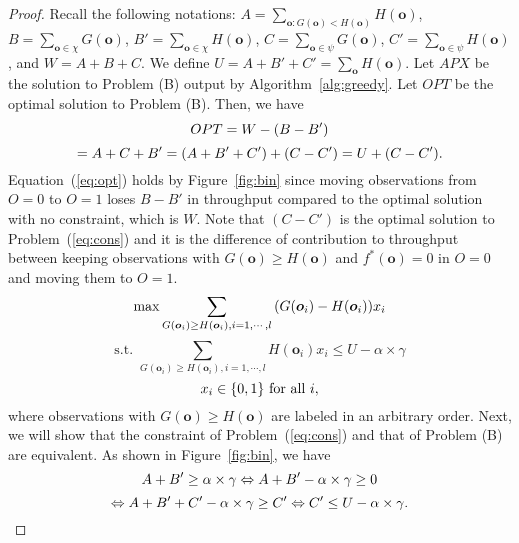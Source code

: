 \documentclass[conference]{IEEEtran}
\begin{document}
\begin{proof}
Recall the following notations: $A=\sum\limits_{\boldsymbol{o}:G(\boldsymbol{o})<H(\boldsymbol{o})}{H(\boldsymbol{o})}$, $B=\sum\limits_{\boldsymbol{o}\in \chi}{G(\boldsymbol{o})}$, $B'=\sum\limits_{\boldsymbol{o}\in \chi}{H(\boldsymbol{o})}$, $C=\sum\limits_{\boldsymbol{o}\in \psi}{G(\boldsymbol{o})}$, $C'=\sum\limits_{\boldsymbol{o}\in \psi}{H(\boldsymbol{o})}$, and $W=A+B+C$. We define $U=A+B'+C'=\sum\limits_{\boldsymbol{o}}{H(\boldsymbol{o})}$. Let $APX$ be the solution to Problem (B) output by Algorithm~\ref{alg:greedy}. Let $OPT$ be the optimal solution to Problem (B). Then, we have 
\vspace{-0.5em}
\begin{equation}
\vspace{-0.5em}
OPT=W-(B-B')
\label{eq:opt}
\end{equation}
\[= A+C+B'=(A+B'+C')+(C-C')=U+(C-C').
\vspace{-0.3em}
\]
Equation~(\ref{eq:opt}) holds by Figure~\ref{fig:bin} since moving observations from $O=0$ to $O=1$ loses $B-B'$ in throughput compared to the optimal solution with no constraint, which is $W$. Note that $(C-C')$ is the optimal solution to Problem~(\ref{eq:cons}) and it is the difference of contribution to throughput between keeping observations with $G(\boldsymbol{o})\ge H(\boldsymbol{o})$ and $f^*(\boldsymbol{o})=0$ in $O=0$ and moving them to $O=1$. 
\[\vspace{-0.5em}
\max \sum\limits_{G({\boldsymbol{o}}_i)\ge H({\boldsymbol{o}}_i),i=1,\cdots, l}{(G({\boldsymbol{o}}_i)-H({\boldsymbol{o}}_i)) x_i}\]
\begin{equation}
\mbox{s.t. }\sum\limits_{G({\boldsymbol{o}}_i) \ge H({\boldsymbol{o}}_i),i=1,\cdots, l}{H({\boldsymbol{o}}_i) x_i}\le U-\alpha \times \gamma
\label{eq:cons}
\end{equation}
\[\vspace{-0.3em}
x_i \in \{0,1\}\mbox{ for all }i,\]
where observations with $G(\boldsymbol{o})\ge H(\boldsymbol{o})$ are labeled in an arbitrary order. Next, we will show that the constraint of Problem~(\ref{eq:cons}) and that of Problem (B) are equivalent. As shown in Figure~\ref{fig:bin}, we have 
\vspace{-0.5em}
\[
\vspace{-0.2em}
A+B'\ge \alpha \times \gamma \Leftrightarrow A+B'-\alpha \times \gamma\ge 0\]
\begin{equation}
\Leftrightarrow A+B'+C'-\alpha\times \gamma\ge C' \Leftrightarrow C'\le U-\alpha\times \gamma .
\vspace{-0.3em}
\end{equation}


\end{proof}
\end{document}
